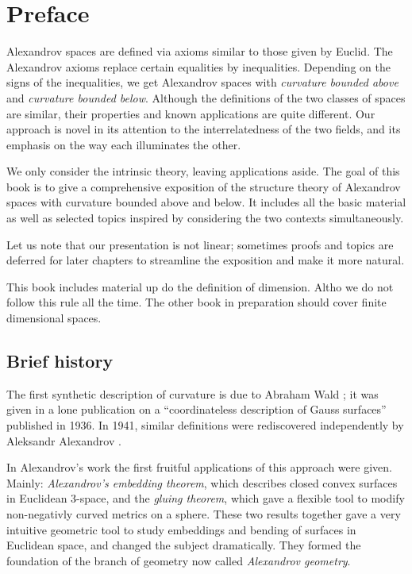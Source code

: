 \chapter*{Preface}

Alexandrov spaces are defined via axioms similar to those given by Euclid.
The Alexandrov axioms replace certain  equalities by inequalities. 
Depending on the signs of the inequalities, we get Alexandrov spaces with \emph{curvature bounded above} and \emph{curvature bounded below}.
Although the definitions of the two classes of spaces are similar, their properties and known applications are quite different.
Our approach is novel in its attention to the interrelatedness of the two fields, and its emphasis on the way each illuminates the other.

We only consider  the intrinsic theory, leaving applications aside.
The goal of this book is to give a comprehensive exposition of the structure theory of Alexandrov spaces 
with curvature bounded above and below.
It includes all the basic material as well as selected topics inspired by considering the two contexts simultaneously.

Let us note that our presentation is not linear;
sometimes proofs and topics are deferred for later chapters to streamline the exposition and make it more natural.

This book includes material up do the definition of dimension.
Altho we do not follow this rule all the time.
The other book in preparation should cover finite dimensional spaces.


\section*{Brief history}

The first synthetic description of curvature is due to Abraham Wald \cite{wald}; 
it was given in a lone publication on a ``coordinateless description of Gauss surfaces'' published in 1936.
In 1941, similar definitions were rediscovered independently by Aleksandr Alexandrov \cite{alexandrov:def}.

In Alexandrov's work the first fruitful applications of this approach were given.
Mainly: \emph{Alexandrov's embedding theorem}, which describes closed convex surfaces in Euclidean 3-space,
and the \emph{gluing theorem}, which gave a flexible tool to modify non-negativly curved metrics on a sphere.
These two results together gave  a very intuitive geometric tool to study embeddings and bending of surfaces in Euclidean space, and changed the subject dramatically.
They formed the foundation of the branch of geometry now called \emph{Alexandrov geometry}.


